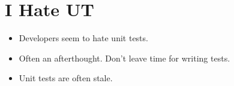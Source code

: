 \documentclass{article}
\begin{document}
\sloppy
\section{I Hate UT}
\begin{itemize}
    \item Developers seem to hate unit tests.
    \item Often an afterthought. Don't leave time for writing tests.
    \item Unit tests are often stale.
\end{itemize}
\end{document}
